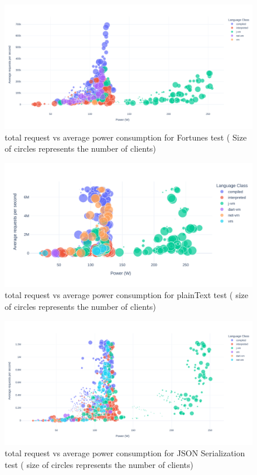\begin{figure}[bht]
    \centering
    \includegraphics[width=
        \columnwidth]{imgs/power_requests_fortune}
    \caption{total request vs average power consumption for Fortunes test ( Size of circles represents the number of clients)}
    \label{fig:power_requests_fortune}
\end{figure}
\begin{figure}[bht]
    \centering
    \includegraphics[width=
        \columnwidth]{imgs/power_requests_plaintext}
    \caption{total request vs average power consumption for plainText test ( size of circles represents the number of clients)}
    \label{fig:power_requests_plaintext}
\end{figure}
\begin{figure}[bht]
    \centering
    \includegraphics[width=
        \columnwidth]{imgs/power_requests_json}
    \caption{total request vs average power consumption for JSON Serialization test ( size of circles represents the number of clients)}
    \label{fig:power_requests_json}
\end{figure}

